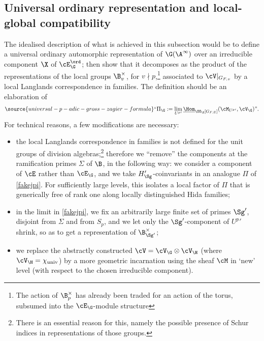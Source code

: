 \subsection{Universal ordinary representation and local-global compatibility}\label{3.2}
The idealised description of what is achieved in this subsection would be to  define a universal ordinary automorphic representation of $\G(\A^{\infty})$  over an irreducible component $\X$ of $\cE_{\G}^{\ord}$; then show that it decomposes as the product of the representations of the local groups $\B_{v}^{\times}$,
for $v\nmid p$,\footnote{The action of $\B_{p}^{\times}$ has already been traded for an action of the torus, subsumed into the $\cE_{\G}$-module structure}     associated to $\cV|_{G_{F,v}}$ by a local Langlands correspondence in  families.
The definition should be an elaboration of
\begin{align}\label{fakejpi}
\source{universal-p-adic-gross-zagier-formula}
``\Pi_{\G}:=\lim_{U^{p}{}'}\underline{\Hom}_{\OO_{\X}[G_{F, E}]}(\cM_{U^{p}{}'}, \cV_{\G})\text{''}.
\end{align}
For technical reasons, a few modifications are necessary:
\begin{itemize}
\item the local  Langlands correspondence in families  is not defined for the unit groups of division algebras;\footnote{There is an essential reason for this, namely the possible presence of Schur indices in representations of those groups.}
therefore we  ``remove'' the components at the ramification primes $\Sigma$ of $\B$, in the following way: we consider a component of $\cE$ rather than $\cE_{\G}$, and we take ${H_{\Sg}'}$-coinvariants in an analogue $\Pi$ of \eqref{fakejpi}. For sufficiently large levels, this isolates a local factor of $\Pi$ that is generically free of rank one along  locally distinguished Hida families;
\item in the limit in \eqref{fakejpi}, we fix an arbitrarily large finite set of primes $\Sg'$, disjoint from $\Sigma$ and from $S_{p}$, and we let only the $\Sg'$-component of  $U^{p}{}'$  shrink, so as to get a representation of $\B_{\Sg'}^{\times}$;
\item
 we replace the abstractly constructed $\cV=\cV_{\G}\otimes \cV_{\H}$ (where $\cV_{\H}=\chi_{\rm univ}$) by a more geometric incarnation using the sheaf $\cM$ in `new' level (with respect to the chosen irreducible component).
\end{itemize}


